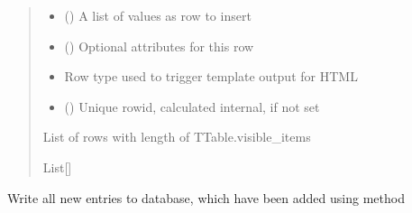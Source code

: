 \documentclass[letterpaper,10pt,english]{sphinxmanual}
\begin{document}
\begin{savenotes}
\begin{fulllineitems}
\begin{savenotes}
\begin{fulllineitems}
\begin{quote}
\begin{description}
\begin{itemize}
\item {} 
\sphinxAtStartPar
{} (\sphinxstyleliteralemphasis{\sphinxupquote{{[}}}\sphinxstyleliteralemphasis{\sphinxupquote{{]}}}) \textendash{} A list of values as row to insert

\item {} 
\sphinxAtStartPar
{} () \textendash{} Optional attributes for this row

\item {} 
\sphinxAtStartPar
{} \textendash{} Row type used to trigger template output for HTML

\item {} 
\sphinxAtStartPar
{} () \textendash{} Unique row\sphinxhyphen{}id, calculated internal, if not set

\end{itemize}

\sphinxAtStartPar
List of rows with length of TTable.visible\_items

\sphinxAtStartPar
List{[}{\hyperref[\detokenize{eezz:eezz.table.TTableRow}]{}}{]}

\end{description}\end{quote}

\end{fulllineitems}\end{savenotes}


\begin{savenotes}\begin{fulllineitems}
\label{\detokenize{eezz:eezz.database.TDatabaseTable.commit}}
\pysigstartsignatures
{}
\pysigstopsignatures
\sphinxAtStartPar
Write all new entries to database, which have been added using method
{\hyperref[\detokenize{eezz:eezz.database.TDatabaseTable.append}]{}}


\end{fulllineitems}
\end{savenotes}
\end{fulllineitems}
\end{savenotes}
\end{document}
